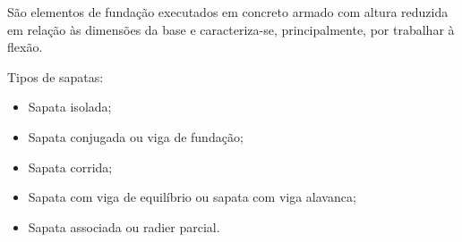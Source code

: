 São elementos de fundação executados em concreto armado com altura reduzida em relação às dimensões da base e caracteriza-se, principalmente, por trabalhar à flexão.

Tipos de sapatas:

\begin{itemize}
	\item Sapata isolada;
	\item Sapata conjugada ou viga de fundação;
	\item Sapata corrida;
	\item Sapata com viga de equilíbrio ou sapata com viga alavanca;
	\item Sapata associada ou radier parcial.
\end{itemize}
